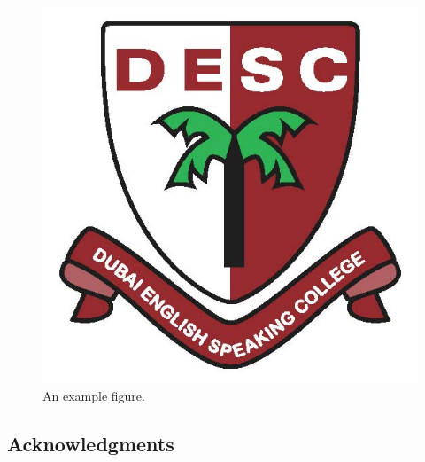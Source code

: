 \documentclass[\docopts]{\docclass}
\begin{document}
\begin{figure}
\includegraphics[width=\columnwidth]{example.jpg}
\caption{An example figure. \label{fig:example}}
\end{figure}


\subsection{Acknowledgments}





\end{document}
